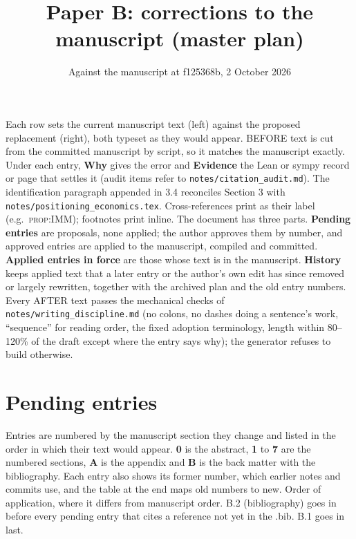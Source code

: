 \documentclass[10pt]{article}
\title{Paper B: corrections to the manuscript (master plan)}
\author{}
\date{Against the manuscript at f125368b, 2 October 2026}
\theoremstyle{definition}
\begin{document}
\maketitle
\vspace{-1.5em}
\noindent Each row sets the current manuscript text (left) against the proposed replacement (right),
both typeset as they would appear. BEFORE text is cut from the committed manuscript by script, so it
matches the manuscript exactly. Under each entry, \textbf{Why} gives the error and \textbf{Evidence} the
Lean or sympy record or page that settles it (audit items refer to \texttt{notes/citation\_audit.md}).
The identification paragraph appended in 3.4 reconciles Section 3 with
\texttt{notes/positioning\_economics.tex}. Cross-references print as their label (e.g.\ \textsc{prop:IMM});
footnotes print inline. The document has three parts. \textbf{Pending entries} are proposals, none
applied; the author approves them by number, and approved entries are applied to the manuscript,
compiled and committed. \textbf{Applied entries in force} are those whose text is in the manuscript.
\textbf{History} keeps applied text that a later entry or the author's own edit has since removed or
largely rewritten, together with the archived plan and the old entry numbers. Every AFTER text passes the
mechanical checks of \texttt{notes/writing\_discipline.md} (no colons, no dashes doing a sentence's
work, ``sequence'' for reading order, the fixed adoption terminology, length within 80--120\% of the
draft except where the entry says why); the generator refuses to build otherwise.

\section*{Pending entries}
Entries are numbered by the manuscript section they change and listed in the order in which their
text would appear. \textbf{0} is the abstract, \textbf{1} to \textbf{7} are the numbered sections,
\textbf{A} is the appendix and \textbf{B} is the back matter with the bibliography. Each entry also
shows its former number, which earlier notes and commits use, and the table at the end maps old
numbers to new. Order of application, where it differs from manuscript order. B.2 (bibliography) goes in before every pending entry that cites a reference not yet in the .bib. B.1 goes in last.
\end{document}
